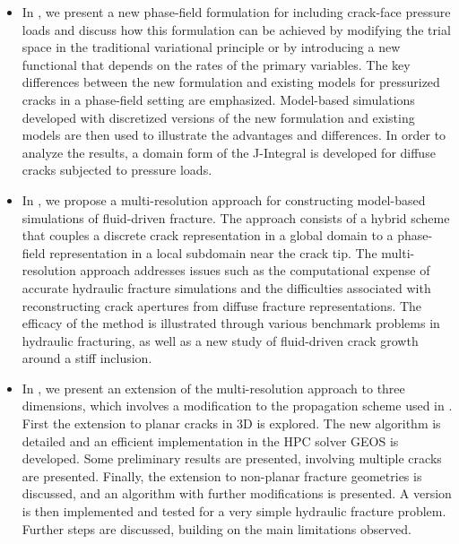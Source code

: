 \begin{itemize}
  \item %
        In , we present a new phase-field formulation for including crack-face pressure loads and discuss how this formulation can be achieved by modifying the trial space in the traditional variational principle or by introducing a new functional that depends on the rates of the primary variables. The key differences between the new formulation and existing models for pressurized cracks in a phase-field setting are emphasized. Model-based simulations developed with discretized versions of the new formulation and existing models are then used to illustrate the advantages and differences. In order to analyze the results, a domain form of the J-Integral is developed for diffuse cracks subjected to pressure loads.
  \item %
        In , we propose a multi-resolution approach for constructing model-based simulations of fluid-driven fracture. The approach consists of a hybrid scheme that couples a discrete crack representation in a global domain to a phase-field representation in a local subdomain near the crack tip. The multi-resolution approach addresses issues such as the computational expense of accurate hydraulic fracture simulations and the difficulties associated with reconstructing crack apertures from diffuse fracture representations. The efficacy of the method is illustrated through various benchmark problems in hydraulic fracturing, as well as a new study of fluid-driven crack growth around a stiff inclusion.
  \item %
        In , we present an extension of the multi-resolution approach to three dimensions, which involves a modification to the propagation scheme used in . First the extension to planar cracks in 3D is explored. The new algorithm is detailed and an efficient implementation in the HPC solver GEOS is developed. Some preliminary results are presented, involving multiple cracks are presented. Finally, the extension to non-planar fracture geometries is discussed, and an algorithm with further modifications is presented. A version is then implemented and tested for a very simple hydraulic fracture problem. Further steps are discussed, building on the main limitations observed. 

\end{itemize}
